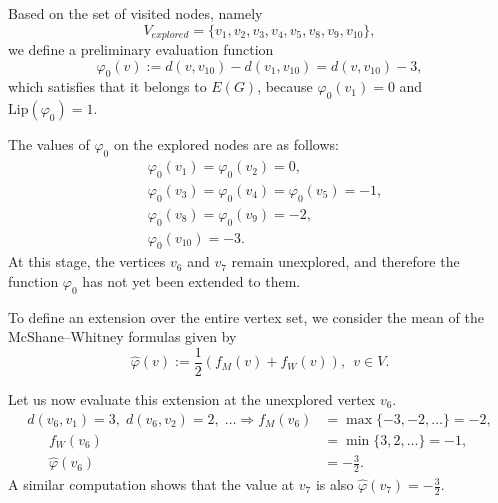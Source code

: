 \documentclass[preprint,12pt]{elsarticle}
\begin{document}
Based on the set of visited nodes, namely 
$$
V_{explored}= \{v_1,v_2,v_3,v_4,v_5,v_8,v_9,v_{10}\},
$$
we define a preliminary evaluation function$$
\varphi_{0}(v) := d(v,v_{10})-d(v_1,v_{10})=d(v,v_{10})-3,
$$
which satisfies that it belongs to $E(G)$, because $\varphi_{0}(v_1)=0$ and $\mathrm{Lip}(\varphi_{0})=1.$

The values of $\varphi_0$ on the explored nodes are as follows:
\begin{align*}
&\varphi_{0}(v_1)=\varphi_{0}(v_2)=0,\\
&\varphi_{0}(v_3)=\varphi_{0}(v_4)=\varphi_{0}(v_5)=-1,\\
&\varphi_{0}(v_8)=\varphi_{0}(v_9)=-2,\\
&\varphi_{0}(v_{10})=-3. 
\end{align*}
At this stage, the vertices $v_6$ and $v_7$ remain unexplored, and therefore the function $\varphi_0$  has not yet been extended to them.

To define an extension over the entire vertex set, we consider the mean of the McShane–Whitney formulas given by
$$
\widehat{\varphi}(v) := \frac{1}{2}\left(f_M(v)+f_W(v)\right), \ \ v \in V.
$$

Let us now evaluate this extension at the unexplored vertex $v_6.$
\begin{align*}
d(v_6,v_1)=3,\; d(v_6,v_2)=2,\; \dots \Longrightarrow 
     f_M(v_6)&=\max\{-3,-2,\dots\}=-2, \\
                     \phantom{\Longrightarrow}
     f_W(v_6)&=\min\{3,2,\dots\}=-1, \\
                     \phantom{\Longrightarrow}
     \widehat{\varphi}(v_6)&=-\frac{3}{2}.
\end{align*}
A similar computation shows that the value at $v_7$ is also $\widehat{\varphi}(v_7)=-\frac{3}{2}.$
\end{document}
